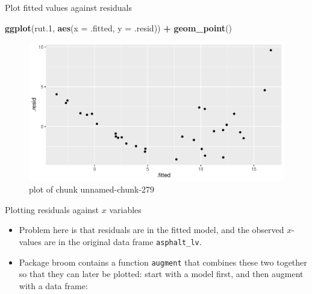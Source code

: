 \documentclass[
  ignorenonframetext,
]{beamer}
\newenvironment{Shaded}{\begin{snugshade}}{\end{snugshade}}
\newcommand{\DataTypeTok}[1]{\textcolor[rgb]{0.13,0.29,0.53}{#1}}
\newcommand{\FloatTok}[1]{\textcolor[rgb]{0.00,0.00,0.81}{#1}}
\newcommand{\KeywordTok}[1]{\textcolor[rgb]{0.13,0.29,0.53}{\textbf{#1}}}
\newcommand{\NormalTok}[1]{#1}
\newcommand{\OperatorTok}[1]{\textcolor[rgb]{0.81,0.36,0.00}{\textbf{#1}}}
\newcommand{\StringTok}[1]{\textcolor[rgb]{0.31,0.60,0.02}{#1}}
\providecommand{\tightlist}{%
  \setlength{\itemsep}{0pt}\setlength{\parskip}{0pt}}
\begin{document}
\begin{frame}[fragile]{Plot fitted values against residuals}
\protect\hypertarget{plot-fitted-values-against-residuals}{}

\begin{Shaded}
\begin{Highlighting}[]
\KeywordTok{ggplot}\NormalTok{(rut}\FloatTok{.1}\NormalTok{, }\KeywordTok{aes}\NormalTok{(}\DataTypeTok{x =}\NormalTok{ .fitted, }\DataTypeTok{y =}\NormalTok{ .resid)) }\OperatorTok{+}\StringTok{ }\KeywordTok{geom_point}\NormalTok{()}
\end{Highlighting}
\end{Shaded}

\begin{figure}
\centering
\includegraphics{figure/unnamed-chunk-279-1.pdf}
\caption{plot of chunk unnamed-chunk-279}
\end{figure}

\end{frame}

\begin{frame}[fragile]{Plotting residuals against \(x\) variables}
\protect\hypertarget{plotting-residuals-against-x-variables}{}

\begin{itemize}
\tightlist
\item
  Problem here is that residuals are in the fitted model, and the
  observed \(x\)-values are in the original data frame
  \texttt{asphalt\_lv}.
\item
  Package broom contains a function \texttt{augment} that combines these
  two together so that they can later be plotted: start with a model
  first, and then augment with a data frame:
\end{itemize}

\begin{Shaded}
\end{Shaded}

\end{frame}
\end{document}
